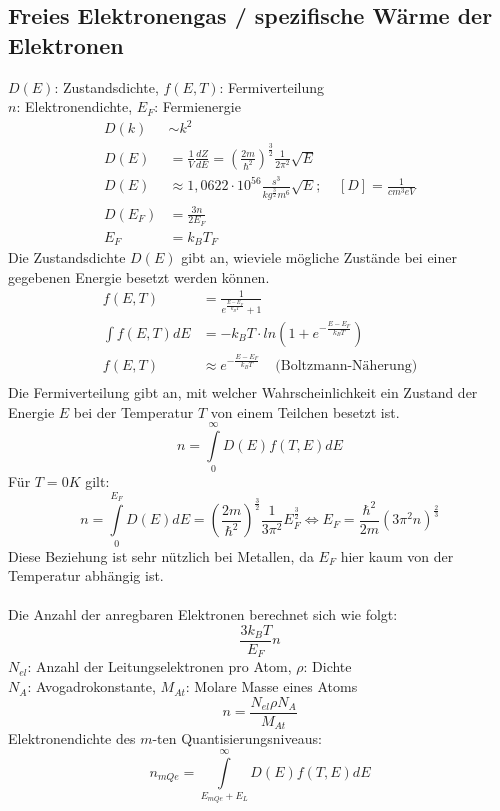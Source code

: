 \documentclass[a4paper,twocolumn,10pt]{article}
\begin{document}
\subsection{Freies Elektronengas / spezifische Wärme der Elektronen}
$D(E)$: Zustandsdichte, $f(E,T)$: Fermiverteilung\\
$n$: Elektronendichte, $E_F$: Fermienergie\\
\begin{equation*}
\begin{split}
D(k)&\sim k^2\\
D(E)&=\frac{1}{V}\frac{dZ}{dE}=\left(\frac{2m}{\hbar^2}\right)^{\frac{3}{2}}\frac{1}{2\pi^2}\sqrt{E}\\
D(E)&\approx 1,0622\cdot 10^{56}\frac{s^3}{kg^{\frac{3}{2}}m^6}\sqrt{E};\;\;\;\;[D]=\frac{1}{cm^3eV}\\
D(E_F)&=\frac{3n}{2E_F}\\
E_F&=k_BT_F
\end{split}
\end{equation*}
Die Zustandsdichte $D(E)$ gibt an, wieviele mögliche Zustände bei einer gegebenen Energie besetzt werden können.\\
\begin{equation*}
\begin{split}
f(E,T)&=\frac{1}{e^{\frac{E-E_F}{k_BT}}+1}\\
\int f(E,T)dE&=-k_BT\cdot ln\left(1+e^{-\frac{E-E_F}{k_BT}}\right)\\
f(E,T)&\approx e^{-\frac{E-E_F}{k_BT}}\;\;\;\;\text{(Boltzmann-Näherung)}\\
\end{split}
\end{equation*}
Die Fermiverteilung gibt an, mit welcher Wahrscheinlichkeit ein Zustand der Energie $E$ bei der Temperatur $T$ von einem Teilchen besetzt ist.
\begin{equation*}
n=\int\limits_{0}^{\infty}D(E)f(T,E)dE
\end{equation*}
Für $T=0K$ gilt:
\begin{equation*}
n=\int\limits_{0}^{E_F}D(E)dE=\left(\frac{2m}{\hbar^2}\right)^{\frac{3}{2}}\frac{1}{3\pi^2}E_F^{\frac{3}{2}}\Leftrightarrow E_F=\frac{\hbar^2}{2m}(3\pi^2n)^{\frac{2}{3}}
\end{equation*}
Diese Beziehung ist sehr nützlich bei Metallen, da $E_F$ hier kaum von der Temperatur abhängig ist.\\\\
Die Anzahl der anregbaren Elektronen berechnet sich wie folgt:
\begin{equation*}
\frac{3k_BT}{E_F}n
\end{equation*}
$N_{el}$: Anzahl der Leitungselektronen pro Atom, $\rho$: Dichte\\
$N_A$: Avogadrokonstante, $M_{At}$: Molare Masse eines Atoms
\begin{equation*}
n=\frac{N_{el}\rho N_A}{M_{At}}
\end{equation*}
Elektronendichte des $m$-ten Quantisierungsniveaus:
\begin{equation*}
n_{mQe}=\int\limits_{E_{mQe}+E_L}^{\infty}D(E)f(T,E)dE
\end{equation*}
\end{document}
